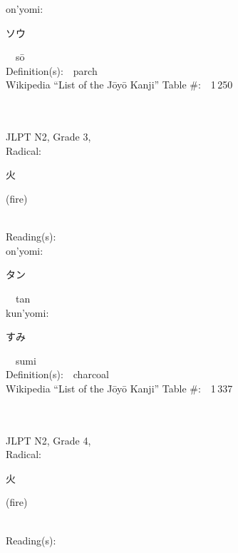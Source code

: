 \begin{multicols}{2}
{\hspace*{1em}}on'yomi:\ \ \\
{\hspace*{2em}}{\begin{CJK}{UTF8}{min} ソウ \end{CJK}}\ \ s\=o\ \ \\
Definition(s):\ \ parch \\
Wikipedia ``List of the J\=oy\=o Kanji'' Table \#:\ \ 1\,250 \\
\ \ \\
{\fontsize{34pt}{40pt}  }\ \ \\  %
{JLPT N2, Grade 3, \\Radical:\ \ {\begin{CJK}{UTF8}{min} 火 \end{CJK}} (fire) } \\
Reading(s):\ \ \\
{\hspace*{1em}}on'yomi:\ \ \\
{\hspace*{2em}}{\begin{CJK}{UTF8}{min} タン \end{CJK}}\ \ tan\ \ \\
{\hspace*{1em}}kun'yomi:\ \ \\
{\hspace*{2em}}{\begin{CJK}{UTF8}{min} すみ \end{CJK}}\ \ sumi\ \ \\
Definition(s):\ \ charcoal \\
Wikipedia ``List of the J\=oy\=o Kanji'' Table \#:\ \ 1\,337 \\
\ \ \\
{\fontsize{34pt}{40pt}  }\ \ \\  %
{JLPT N2, Grade 4, \\Radical:\ \ {\begin{CJK}{UTF8}{min} 火 \end{CJK}} (fire) } \\
Reading(s):\ \ \\

\end{multicols}
